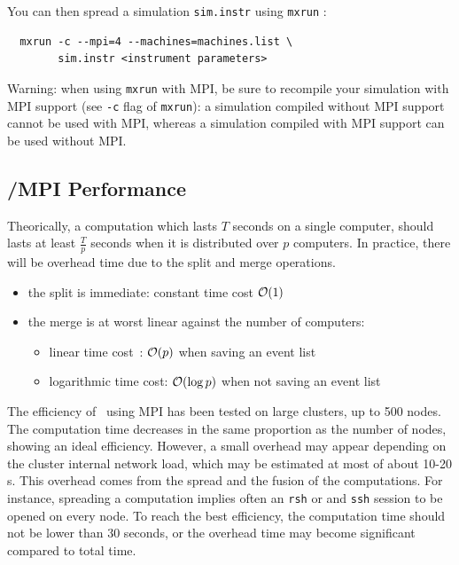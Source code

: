 You can then spread a simulation \verb'sim.instr' using \verb'mxrun' :
\begin{verbatim}
  mxrun -c --mpi=4 --machines=machines.list \
        sim.instr <instrument parameters>
\end{verbatim}

\begin{paragraph}{Warning:} when using \verb'mxrun' with MPI, be sure
  to recompile your simulation with MPI support (see \verb'-c' flag of
  \verb'mxrun'): a simulation compiled without MPI support cannot be
  used with MPI, whereas a simulation compiled with MPI support can be
  used without MPI.
\end{paragraph}

\subsection{\MCX /MPI Performance}

Theorically, a computation which lasts $T$ seconds on a single computer,
should lasts at least $\frac{T}{p}$ seconds when it is distributed
over $p$ computers. In practice, there will be overhead time due to the split
and merge operations.
\begin{itemize}
\item the split is immediate: constant time cost ${\cal O}(1)$
\item the merge is at worst linear against the number of computers:
  \begin{itemize}
  \item linear time cost~: ${\cal O}(p)$ when saving an event list
  \item logarithmic time cost: ${\cal O}(\log{p})$ when not saving an
  event list
  \end{itemize}
\end{itemize}

The efficiency of \MCX\ using MPI has been tested on large clusters, up to 500 nodes.
The computation time decreases in the same proportion as the number of nodes, 
showing an ideal efficiency. However, a small overhead may appear depending on the cluster 
internal network load, which may be estimated at most of about 10-20 s. 
This overhead comes from the spread and the
fusion of the computations. For instance, spreading a computation
implies often an \verb'rsh' or and \verb'ssh' session to be opened on
every node.
To reach the best efficiency, the computation time should not be lower than 30 seconds,
or the overhead time may become significant compared to total time.

